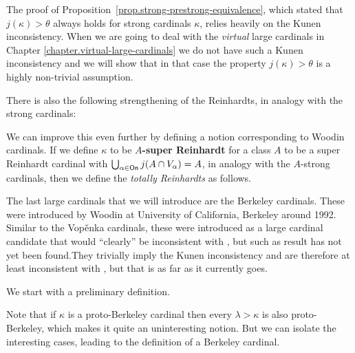\documentclass[../../main]{subfiles}
\begin{document}
The proof of Proposition~\ref{prop.strong-prestrong-equivalence}, which stated that $j(\kappa)>\theta$ always holds for strong cardinals $\kappa$, relies heavily on the Kunen inconsistency. When we are going to deal with the \textit{virtual} large cardinals in Chapter \ref{chapter.virtual-large-cardinals} we do not have such a Kunen inconsistency and we will show that in that case the property $j(\kappa)>\theta$ is a highly non-trivial assumption.

\qquad There is also the following strengthening of the Reinhardts, in analogy with the strong cardinals:


We can improve this even further by defining a notion corresponding to Woodin cardinals. If we define $\kappa$ to be \textbf{$A$-super Reinhardt} for a class $A$ to be a super Reinhardt cardinal with $\bigcup_{\alpha\in\textsf{On}}j(A\cap V_\alpha)=A$, in analogy with the $A$-strong cardinals, then we define the \textit{totally Reinhardts} as follows.


The last large cardinals that we will introduce are the Berkeley cardinals. These were introduced by Woodin at University of California, Berkeley around 1992. Similar to the Vop\v enka cardinals, these were introduced as a large cardinal candidate that would ``clearly'' be inconsistent with \zf, but such as result has not yet been found.They trivially imply the Kunen inconsistency and are therefore at least inconsistent with \zfc, but that is as far as it currently goes.

\qquad We start with a preliminary definition.


Note that if $\kappa$ is a proto-Berkeley cardinal then every $\lambda>\kappa$ is also proto-Berkeley, which makes it quite an uninteresting notion. But we can isolate the interesting cases, leading to the definition of a Berkeley cardinal. 
\end{document}
